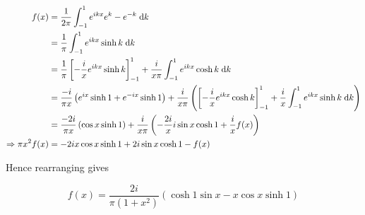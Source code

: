 \documentclass[a4paper]{article}
\begin{document}
\begin{align*}
f(x) & =  \frac{1}{2\pi} \int_{-1}^{1} e^{ikx} e^{k} - e^{-k} \; \mathrm{d} k \\
& = \frac{1}{\pi} \int_{-1}^{1} e^{ikx} \sinh k \; \mathrm{d} k \\
& = \frac{1}{\pi} \left[ - \frac{i}{x} e^{ikx} \sinh k   \right]_{-1}^{1} + \frac{i}{x\pi} \int_{-1}^{1} e^{ikx} \cosh k \; \mathrm{d} k  \\
& = \frac{-i}{\pi x} \left(  e^{ix}\sinh 1 + e^{-ix}\sinh 1   \right) + \frac{i}{x \pi} \left( \left[ - \frac{i}{x} e^{ikx} \cosh k   \right]_{-1}^{1} + \frac{i}{x} \int_{-1}^{1} e^{ikx} \sinh k \; \mathrm{d} k \right)  \\
& =  \frac{-2i}{\pi x} \left( \cos x \sinh 1   \right) + \frac{i}{x \pi} \left( - \frac{2i}{x} i \sin x \cosh 1 + \frac{i}{x} f(x) \right)  \\
\Rightarrow \pi x^{2} f(x) & = -2i x \cos x \sinh 1 + 2 i \sin x \cosh 1 - f(x)
\end{align*}

Hence rearranging gives

\[ f(x) = \frac{2i}{\pi(1+x^{2})} (  \cosh 1 \sin x - x \cos x \sinh 1 ) \]
\end{document}
